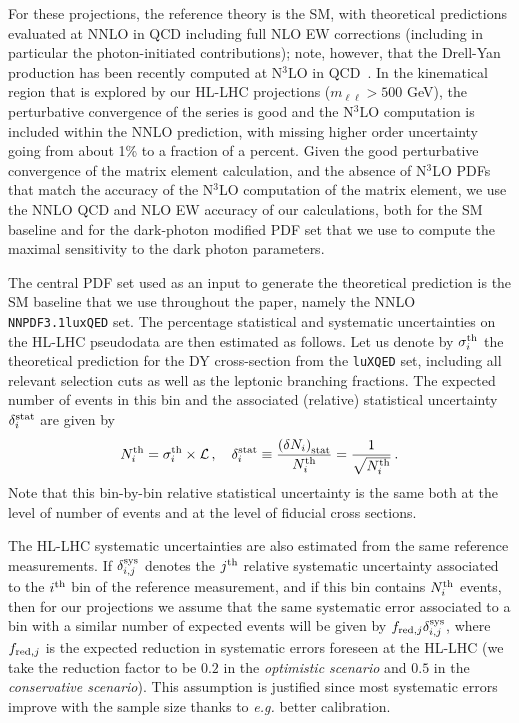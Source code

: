 \documentclass[withindex,glossary]{cam-thesis}
\begin{document}
For these projections, the reference theory is the SM, with
theoretical predictions evaluated at NNLO in QCD including full 
NLO EW corrections (including in particular the photon-initiated
contributions); note, however, that the Drell-Yan production has been recently computed at
N${}^3$LO in QCD~\cite{Duhr:2020seh,Duhr:2021vwj}. In the kinematical
region that is explored by our HL-LHC projections ($m_{\ell\ell}>500$
GeV), the perturbative convergence of the series is good and
the N${}^3$LO computation is included within the NNLO prediction, with
missing higher order uncertainty going from about 1\% to a fraction of
a percent. Given the good perturbative convergence of
the matrix element calculation, and the absence of N${}^3$LO PDFs that match
the accuracy of the N${}^3$LO computation of the matrix element, we use the NNLO QCD and NLO EW accuracy of our calculations, both for the SM
baseline and for the dark-photon modified PDF set that we use to
compute the maximal sensitivity to the dark photon parameters. 

The central PDF set used as an input to generate the theoretical prediction is the SM baseline
that we use throughout the paper, namely the NNLO {\tt NNPDF3.1luxQED} set.
The percentage statistical and systematic uncertainties on the HL-LHC pseudodata are then estimated as follows.
Let us denote by  $\sigma^{\rm th}_{i}$ the theoretical prediction for the
DY cross-section from the \texttt{luXQED} set, including all relevant selection cuts
as well as the leptonic branching fractions.
%
The expected number of events in this bin and the associated (relative)
statistical uncertainty $\delta_i^{\rm stat}$ are given by 
\begin{equation}
  N_{i}^{\rm th}= \sigma^{\rm th}_{i}\times \mathcal{L} \,, \quad \delta_i^{\rm stat}\equiv
  \frac{\left( \delta N_{i}\right)_{\rm stat}}{N_{i}^{\rm th}} = \frac{1}{\sqrt{N_{i}^{\rm th}}} \, .
\end{equation}
Note that this bin-by-bin relative statistical uncertainty is the same both at the level
of number of events and at the level of fiducial cross sections.

The HL-LHC systematic uncertainties are also estimated from the same reference
measurements.
%
If $\delta_{i,j}^{\rm sys}$ denotes the $j^{\rm th}$ relative systematic uncertainty
associated to the $i^{\rm th}$ bin of the reference
measurement, and if this bin contains $N_i^{\rm th}$ events,
then for our projections we assume that the same systematic error
associated to a bin with a similar number of expected events will be given by 
$f_{{\rm red},j}\delta_{i,j}^{\rm sys}$, where $f_{{\rm red},j}$
is the expected reduction in systematic errors foreseen at the HL-LHC (we take the reduction factor to be $0.2$ in the \textit{optimistic scenario} and $0.5$ in the \textit{conservative scenario}).
%
This assumption is justified since most systematic errors improve with the sample size
thanks to {\it e.g.} better calibration.
\end{document}
